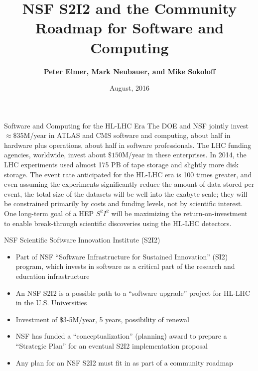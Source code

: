 \documentclass[compress,10]{beamer}
\title{NSF S2I2 and the Community Roadmap for Software and Computing}
\author[Peter Elmer, Mark Neubauer, and Mike Sokoloff]
{
 \textcolor{LHCb dark}{\bf  Peter Elmer, Mark Neubauer, and Mike Sokoloff}
}
\date{August, 2016}
\begin{document}
\begin{frame}[noframenumbering]
	\titlepage
\end{frame}
\begin{frame}[fragile]{Software and Computing for the HL-LHC Era}{}
{\footnotesize
The DOE and NSF jointly invest $ \approx \$ 35 $M/year in
ATLAS and CMS software and computing, about half in hardware plus operations,
about half in software professionals.
The LHC funding agencies, worldwide, invest about $ \$ 150 $M/year
in these enterprises.
In 2014, the LHC experiments used almost 175 PB of tape storage and
slightly more disk storage.
The event rate anticipated for the HL-LHC era is 100 times greater,
and even assuming the experiments significantly reduce the
amount of data stored per event,
the total size of the datasets will be well into the exabyte
scale;
they will be constrained primarily by costs and funding levels,
not by scientific interest.
One long-term goal of a HEP $ S^2 I^2 $
will be
maximizing the return-on-investment to enable break-through
scientific discoveries using the  HL-LHC detectors.
}  %
\end{frame}
\begin{frame}[fragile]{NSF Scientific Software Innovation Institute (S2I2)}{}

{\footnotesize
\begin{itemize} 
\item Part of NSF ``Software Infrastructure for Sustained Innovation'' (SI2) program, which invests in software as a critical part of the research and education infrastructure
\item An NSF S2I2 is a possible path to a ``software upgrade'' project for HL-LHC in the U.S. Universities 
\item Investment of \$3-5M/year, 5 years, possibility of renewal
\item NSF has funded a ``conceptualization'' (planning) award to prepare a ``Strategic Plan'' for an eventual S2I2 implementation proposal
\item Any plan for an NSF S2I2 must fit in as part of a community roadmap
\end{itemize}
}  %

\end{frame}
\end{document}
